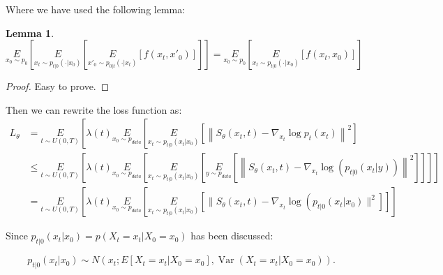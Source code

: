 \documentclass{article}
\newtheorem{proof}{Proof}
\newtheorem{lemma}{Lemma}
\begin{document}
Where we have used the following lemma:
\begin{lemma}
    \begin{equation}
        \underset{x_0\sim p_0}{E}\left[\underset{x_t\sim p_{t|0}(\cdot|x_0)}{E}\left[\underset{x'_0\sim p_{0|t}(\cdot|x_t)}{E}\left[f(x_t, x'_0)\right]\right]\right]=\underset{x_0\sim p_0}{E}\left[\underset{x_t\sim p_{t|0}(\cdot|x_0)}{E}\left[f(x_t, x_0)\right]\right]
    \end{equation}
\end{lemma}
\begin{proof}
    Easy to prove.
\end{proof}
Then we can rewrite the loss function as:
\begin{equation}
    \begin{aligned}
        L_{\theta}&=\underset{t\sim U(0,T)}{E}\left[\lambda(t) \underset{x_{0}\sim p_{data}}{E}\left[\underset{x_{t}\sim p_{t|0}(x_t|x_0)}{E}\left[\left\|S_{\theta}\left(x_{t}, t\right)-\nabla _{x_t}\log p_{t}\left(x_{t}\right)\right\|^{2}\right]\right.\right.\\ 
        &\leqslant \underset{t\sim U(0,T)}{E}\left[\lambda(t) \underset{x_{0}\sim p_{data}}{E}\left[\underset{x_{t}\sim p_{t|0}(x_t|x_0)}{E}\left[\underset{y\sim p_{data}}{E}\left[\left\|S_{\theta}\left(x_{t}, t\right)-\nabla_{x_{t}} \log \left(p_{t|0}(x_t | y)\right)\right\|^{2}\right]\right]\right]\right] \\
        &=\underset{t\sim U(0, T)}{E}\left[\lambda(t) \underset{x_{0}\sim p_{data}}{E}\left[\underset{x_{t}\sim p_{t|0}(x_t|x_0)}{E}\left[\| S_{\theta}\left(x_{t}, t\right)-\nabla_{x_{t}} \log \left(p_{t|0}\left(x_{t} | x_{0}\right) \|^{2}\right]\right]\right]\right.
    \end{aligned}
\end{equation}


Since  $p_{t|0}\left(x_{t} | x_{0}\right)=p\left(X_{t}=x_{t} | X_{0}=x_{0}\right)$  has been discussed:

$$p_{t | 0}\left(x_{t} | x_{0}\right) \sim N\left(x_{t} ; E\left[X_{t}=x_t | X_{0}=x_{0}\right], \operatorname{Var}\left(X_{t}=x_t | X_{0}=x_{0}\right)\right) .$$
\end{document}
